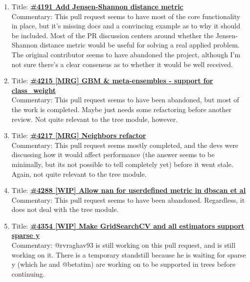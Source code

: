 \documentclass[12pt, oneside]{article}
\begin{document}
\begin{enumerate}
  \item 
  Title:
  \textbf{\href{https://github.com/scikit-learn/scikit-learn/pull/4191}
    {\#4191 Add Jensen-Shannon distance metric}}\\
  Commentary: This pull request seems to have most of the core
  functionality in place, but it's missing docs and a convincing
  example as to why it should be included. Most of the PR discussion
  centers around whether the Jensen-Shannon distance metric would be
  useful for solving a real applied problem. The original contributor
  seems to have abandoned the project, although I'm not sure there's a
  clear consensus as to whether it would be well received.

  \item 
  Title:
  \textbf{\href{https://github.com/scikit-learn/scikit-learn/pull/4215}
    {\#4215 [MRG] GBM \& meta-ensembles - support for class\_weight}}\\
  Commentary: This pull request seems to have been abandoned, but most
  of the work is completed. Maybe just needs some refactoring before
  another review. Not quite relevant to the tree module, however.

  \item 
  Title:
  \textbf{\href{https://github.com/scikit-learn/scikit-learn/pull/4217}
    {\#4217 [MRG] Neighbors refactor}}\\
  Commentary: This pull request seems mostly completed, and the devs
  were discussing how it would affect performance (the answer seems to
  be minimally, but its not possible to tell completely yet) before it
  went stale. Again, not quite relevant to the tree module.

  \item 
  Title:
  \textbf{\href{https://github.com/scikit-learn/scikit-learn/pull/4288}
    {\#4288 [WIP] Allow nan for userdefined metric in dbscan et al}}\\
  Commentary: This pull request seems to have been
  abandoned. Regardless, it does not deal with the tree
  module.

  \item 
  Title:
  \textbf{\href{https://github.com/scikit-learn/scikit-learn/pull/4354}
    {\#4354 [WIP] Make GridSearchCV and all estimators support sparse y}}\\
  Commentary: @rvraghav93 is still working on this pull request, and
  is still working on it. There is a temporary standstill because he
  is waiting for sparse y (which he and @betatim) are working on to be
  supported in trees before continuing.


\end{enumerate}
\end{document}
